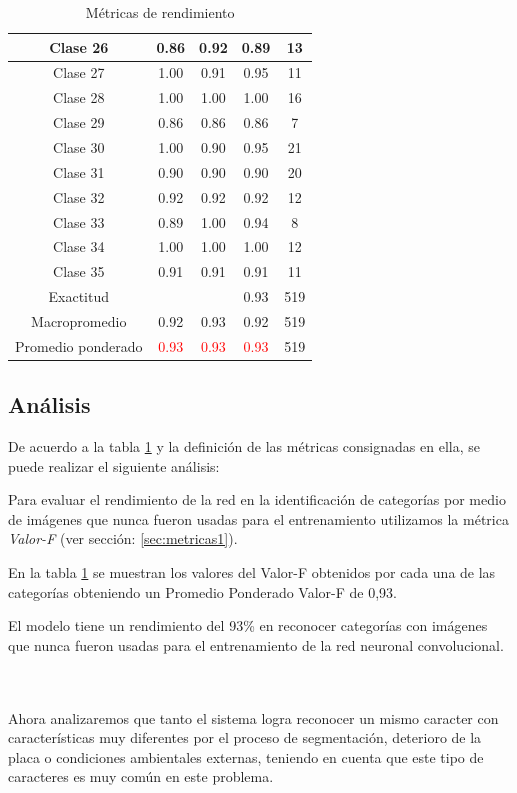 \begin{table}[H]
\begin{center}
{\begin{tabular}{||c|c|c|c|c||}
    Clase 26 & 0.86 & 0.92 & 0.89 &  13\\\hline
    Clase 27 & 1.00 & 0.91 & 0.95 &  11\\\hline
    Clase 28 & 1.00 & 1.00 & 1.00 &  16\\\hline
    Clase 29 & 0.86 & 0.86 & 0.86 &   7\\\hline
    Clase 30 & 1.00 & 0.90 & 0.95 &  21\\\hline
    Clase 31 & 0.90 & 0.90 & 0.90 &  20\\\hline
    Clase 32 & 0.92 & 0.92 & 0.92 &  12\\\hline
    Clase 33 & 0.89 & 1.00 & 0.94 &   8\\\hline
    Clase 34 & 1.00 & 1.00 & 1.00 &  12\\\hline
    Clase 35 & 0.91 & 0.91 & 0.91 &  11\\\hline
\hline
    Exactitud &  & & 0.93  &  519\\\hline
   Macropromedio  &  0.92  &  0.93  &  0.92  &  519\\\hline
Promedio ponderado & \textcolor{red}{0.93}  &  \textcolor{red}{0.93}   & \textcolor{red}{0.93}  &  519\\
\hline
\hline
\end{tabular}
}
\caption{\label{table:Metricas segmentada}Métricas de rendimiento}
\end{center}
\end{table}

\subsection*{Análisis}
De acuerdo a la tabla \ref{table:Metricas segmentada} y la definición de las métricas consignadas en ella, se puede realizar el siguiente análisis:

Para evaluar el rendimiento de la red en la identificación de categorías por medio de imágenes que nunca fueron usadas para el entrenamiento utilizamos la métrica \textit{Valor-F} (ver sección: \ref{sec:metricas1}).

En la tabla \ref{table:Metricas segmentada} se muestran los valores del Valor-F obtenidos por cada una de las categorías obteniendo un Promedio Ponderado Valor-F de 0,93.\\ 

\begin{tcolorbox}
[colback=blue!5!white,colframe=blue!45!black,fonttitle=\bfseries,title=Conclusión]
   El modelo tiene un rendimiento del 93\% en reconocer categorías con imágenes que nunca fueron usadas para el entrenamiento de la red neuronal convolucional.
\end{tcolorbox}\\
\\
Ahora analizaremos que tanto el sistema logra reconocer un mismo caracter con características muy diferentes por el proceso de segmentación, deterioro de la placa o condiciones ambientales externas, teniendo en cuenta que este tipo de caracteres es muy común en este problema.

